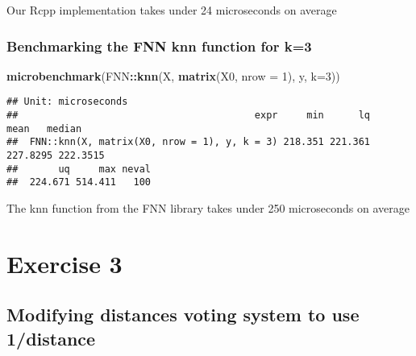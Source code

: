 \documentclass[]{article}
\newenvironment{Shaded}{\begin{snugshade}}{\end{snugshade}}
\newcommand{\DataTypeTok}[1]{\textcolor[rgb]{0.13,0.29,0.53}{#1}}
\newcommand{\DecValTok}[1]{\textcolor[rgb]{0.00,0.00,0.81}{#1}}
\newcommand{\KeywordTok}[1]{\textcolor[rgb]{0.13,0.29,0.53}{\textbf{#1}}}
\newcommand{\NormalTok}[1]{#1}
\newcommand{\OperatorTok}[1]{\textcolor[rgb]{0.81,0.36,0.00}{\textbf{#1}}}
\begin{document}
Our Rcpp implementation takes under 24 microseconds on average

\hypertarget{benchmarking-the-fnn-knn-function-for-k3}{%
\subsubsection{Benchmarking the FNN knn function for
k=3}\label{benchmarking-the-fnn-knn-function-for-k3}}

\begin{Shaded}
\begin{Highlighting}[]
\KeywordTok{microbenchmark}\NormalTok{(FNN}\OperatorTok{::}\KeywordTok{knn}\NormalTok{(X, }\KeywordTok{matrix}\NormalTok{(X0, }\DataTypeTok{nrow =} \DecValTok{1}\NormalTok{), y, }\DataTypeTok{k=}\DecValTok{3}\NormalTok{))}
\end{Highlighting}
\end{Shaded}

\begin{verbatim}
## Unit: microseconds
##                                         expr     min      lq     mean   median
##  FNN::knn(X, matrix(X0, nrow = 1), y, k = 3) 218.351 221.361 227.8295 222.3515
##       uq     max neval
##  224.671 514.411   100
\end{verbatim}

The knn function from the FNN library takes under 250 microseconds on
average

\newpage

\hypertarget{exercise-3}{%
\section{Exercise 3}\label{exercise-3}}

\hypertarget{modifying-distances-voting-system-to-use-1distance}{%
\subsection{Modifying distances voting system to use
1/distance}\label{modifying-distances-voting-system-to-use-1distance}}
\end{document}
